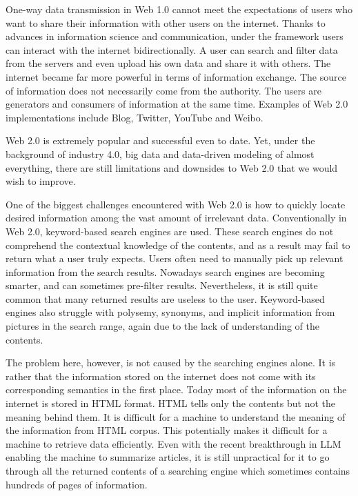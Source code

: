 One-way data transmission in Web 1.0 cannot meet the expectations of users who want to share their information with other users on the internet. Thanks to advances in information science and communication, under the  framework users can interact with the internet bidirectionally. A user can search and filter data from the servers and even upload his own data and share it with others. The internet became far more powerful in terms of information exchange. The source of information does not necessarily come from the authority. The users are generators and consumers of information at the same time. Examples of Web 2.0 implementations include Blog, Twitter, YouTube and Weibo.

Web 2.0 is extremely popular and successful even to date. Yet, under the background of industry 4.0, big data and data-driven modeling of almost everything, there are still limitations and downsides to Web 2.0 that we would wish to improve.

One of the biggest challenges encountered with Web 2.0 is how to quickly locate desired information among the vast amount of irrelevant data. Conventionally in Web 2.0, keyword-based search engines are used. These search engines do not comprehend the contextual knowledge of the contents, and as a result may fail to return what a user truly expects. Users often need to manually pick up relevant information from the search results. Nowadays search engines are becoming smarter, and can sometimes pre-filter results. Nevertheless, it is still quite common that many returned results are useless to the user. Keyword-based engines also struggle with polysemy, synonyms, and implicit information from pictures in the search range, again due to the lack of understanding of the contents.

The problem here, however, is not caused by the searching engines alone.  It is rather that the information stored on the internet does not come with its corresponding semantics in the first place. Today most of the information on the internet is stored in HTML format. HTML tells only the contents but not the meaning behind them. It is difficult for a machine to understand the meaning of the information from HTML corpus. This potentially makes it difficult for a machine to retrieve data efficiently. Even with the recent breakthrough in LLM enabling the machine to summarize articles, it is still unpractical for it to go through all the returned contents of a searching engine which sometimes contains hundreds of pages of information.

